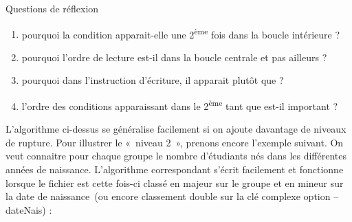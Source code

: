 
\begin{Emphase}[reflexion]{Questions de réflexion}
\begin{enumerate}
	\item 
		pourquoi la condition 
		apparait-elle une 2\textsuperscript{ème} fois dans la boucle 
		intérieure ?
	\item 
		pourquoi l’ordre de lecture est-il dans la boucle centrale et pas
		ailleurs ?
	\item 
		pourquoi dans l’instruction d’écriture, il apparait
		 plutôt que
		 ?
	\item 
		l’ordre des conditions apparaissant dans le 2\textsuperscript{ème} tant
		que est-il important ?
\end{enumerate}
\end{Emphase}

L’algorithme ci-dessus se généralise facilement si on ajoute davantage
de niveaux de rupture. Pour illustrer le «~niveau 2~», prenons encore
l’exemple suivant. On veut connaitre pour chaque groupe le nombre
d’étudiants nés dans les différentes années de naissance. L’algorithme
correspondant s’écrit facilement et fonctionne lorsque le fichier est
cette fois-ci classé en majeur sur le groupe et en mineur sur la date
de naissance~(ou encore classement double sur la clé complexe option –
dateNais) :

